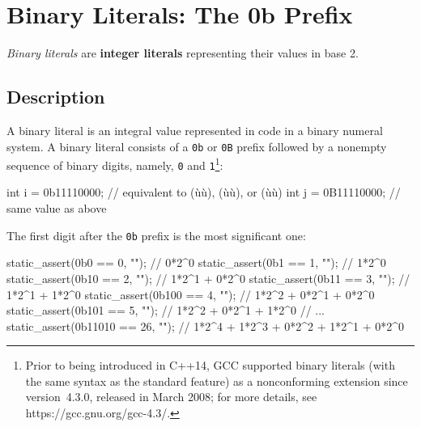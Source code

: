 \newpage
\section[Binary Literals]{Binary Literals: The {\SecCode 0b} Prefix}\label{binary-literals}

\textit{Binary literals} are \textbf{integer literals} representing their values in base 2.

\subsection[Description]{Description}\label{description-binary}

A binary literal is an integral value represented in code in a binary numeral system. A binary literal consists of a \lstinline!0b! or \lstinline!0B! prefix followed by a nonempty sequence of binary digits, namely, \lstinline!0! and \lstinline!1!{\cprotect\footnote{Prior to being introduced in C++14, GCC supported binary literals (with the same syntax as the standard feature) as a nonconforming extension since version~4.3.0, released in March 2008;
for more details, see https://gcc.gnu.org/gcc-4.3/.}}:


\begin{emcppslisting}[emcppsbatch=e1]
int i = 0b11110000;  // equivalent to (ù{}ù), (ù{}ù), or (ù{}ù)
int j = 0B11110000;  // same value as above
\end{emcppslisting}

\noindent The first digit after the \lstinline!0b! prefix is the most significant
one:

\begin{emcppslisting}[emcppsbatch=e1]
static_assert(0b0     ==  0, "");  // 0*2^0
static_assert(0b1     ==  1, "");  // 1*2^0
static_assert(0b10    ==  2, "");  // 1*2^1 + 0*2^0
static_assert(0b11    ==  3, "");  // 1*2^1 + 1*2^0
static_assert(0b100   ==  4, "");  // 1*2^2 + 0*2^1 + 0*2^0
static_assert(0b101   ==  5, "");  // 1*2^2 + 0*2^1 + 1*2^0
// ...
static_assert(0b11010 == 26, "");  // 1*2^4 + 1*2^3 + 0*2^2 + 1*2^1 + 0*2^0
\end{emcppslisting}


